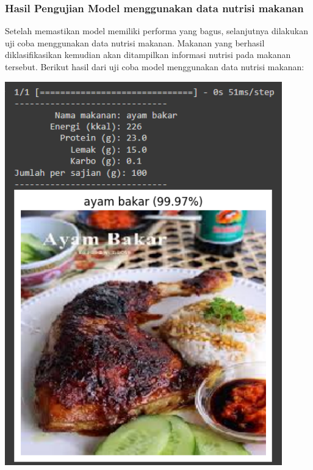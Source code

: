\subsubsection{Hasil Pengujian Model menggunakan data nutrisi makanan}
Setelah memastikan model memiliki performa yang bagus, selanjutnya dilakukan uji coba menggunakan data nutrisi makanan. Makanan yang berhasil diklasifikasikan kemudian akan ditampilkan informasi nutrisi pada makanan tersebut. Berikut hasil dari uji coba model menggunakan data nutrisi makanan: 
\begin{afigure}
    \includegraphics[height=0.55\textheight, width=0.9\textwidth, center]{images/predict-1.png}
    \label{fig:predict-1}
\end{afigure}
\pagebreak
